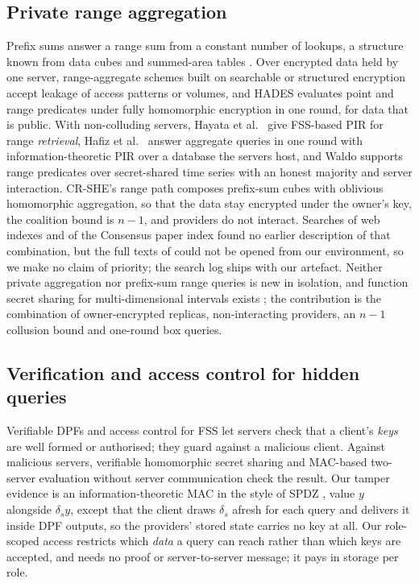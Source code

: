 \documentclass[a4paper,fleqn]{cas-sc}
\begin{document}
\subsection{Private range aggregation}
Prefix sums answer a range sum from a constant number of lookups, a structure
known from data cubes \citep{ho1997range} and summed-area tables
\citep{crow1984summed}. Over encrypted data held by one server, range-aggregate
schemes built on searchable or structured encryption
\citep{demertzis2018practical,espiritu2022arq} accept leakage of access
patterns or volumes, and HADES \citep{liu2025hades} evaluates point and range
predicates under fully homomorphic encryption in one round, for data that is
public. With non-colluding servers, Hayata et al.\ \citep{hayata2020private}
give FSS-based PIR for range \emph{retrieval}, Hafiz et
al.\ \citep{hafiz2024private} answer aggregate queries in one round with
information-theoretic PIR over a database the servers host, and Waldo
\citep{waldo} supports range predicates over secret-shared time series with an
honest majority and server interaction. CR-SHE's range path composes prefix-sum
cubes with oblivious homomorphic aggregation, so that the data stay encrypted
under the owner's key, the coalition bound is $n-1$, and providers do not
interact. Searches of web indexes and of the Consensus paper index found no
earlier description of that combination, but the full texts of
\citep{hafiz2024private,liu2025hades,espiritu2022arq,hayata2020private,gupta2020obscure}
could not be opened from our environment, so we make no claim of priority; the
search log ships with our artefact. Neither private aggregation nor prefix-sum
range queries is new in isolation, and function secret sharing for
multi-dimensional intervals exists \citep{boyle2016function}; the contribution
is the combination of owner-encrypted replicas, non-interacting providers, an
$n-1$ collusion bound and one-round box queries.

\subsection{Verification and access control for hidden queries}
Verifiable DPFs \citep{decastro2022lightweight} and access control for FSS
\citep{pacl,ji2023finegrained} let servers check that a client's \emph{keys}
are well formed or authorised; they guard against a malicious client. Against
malicious servers, verifiable homomorphic secret sharing
\citep{choudhuri2024vehss} and MAC-based two-server evaluation without server
communication \citep{li2026silent} check the result. Our tamper evidence is an
information-theoretic MAC in the style of SPDZ \citep{damgard2012spdz}, value
$y$ alongside $\delta_s y$, except that the client draws $\delta_s$ afresh for
each query and delivers it inside DPF outputs, so the providers' stored state
carries no key at all. Our role-scoped access restricts which \emph{data} a
query can reach rather than which keys are accepted, and needs no proof or
server-to-server message; it pays in storage per role.
\end{document}
